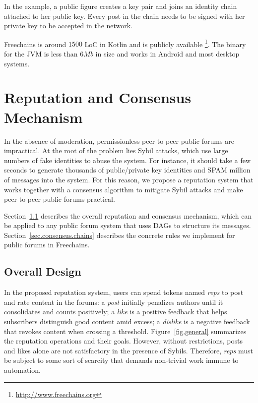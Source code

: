 \documentclass[10pt,journal,compsoc]{IEEEtran}
\newcommand{\FC}       {Freechains\xspace}
\newcommand{\reps}     {\emph{reps}\xspace}
\begin{document}
In the example, a public figure creates a key pair and joins an identity chain
attached to her public key.
Every post in the chain needs to be signed with her private key to be accepted
in the network.

\FC is around $1500$ LoC in Kotlin and is publicly available%
\footnote{\url{http://www.freechains.org}}.
The binary for the JVM is less than $6Mb$ in size and works in Android and most
desktop systems.

\section{Reputation and Consensus Mechanism}
\label{sec.consensus}

In the absence of moderation, permissionless peer-to-peer public forums are
impractical.
At the root of the problem lies Sybil attacks, which use large numbers of fake
identities to abuse the system.
For instance, it should take a few seconds to generate thousands of
public/private key identities and SPAM million of messages into the system.
For this reason, we propose a reputation system that works together with a
consensus algorithm to mitigate Sybil attacks and make peer-to-peer public
forums practical.

Section~\ref{sec.consensus.design} describes the overall reputation and
consensus mechanism, which can be applied to any public forum system that uses
DAGs to structure its messages.
Section~\ref{sec.consensus.chains} describes the concrete rules we implement
for public forums in \FC.

\subsection{Overall Design}
\label{sec.consensus.design}

In the proposed reputation system, users can spend tokens named \reps to post
and rate content in the forums:
a \emph{post} initially penalizes authors until it consolidates and counts
positively;
a \emph{like} is a positive feedback that helps subscribers distinguish good
content amid excess;
a \emph{dislike} is a negative feedback that revokes content when crossing a
threshold.
Figure~\ref{fig.general} summarizes the reputation operations and their goals.
%
However, without restrictions, posts and likes alone are not satisfactory in
the presence of Sybils.
Therefore, \reps must be subject to some sort of scarcity that demands
non-trivial work immune to automation.
\end{document}
